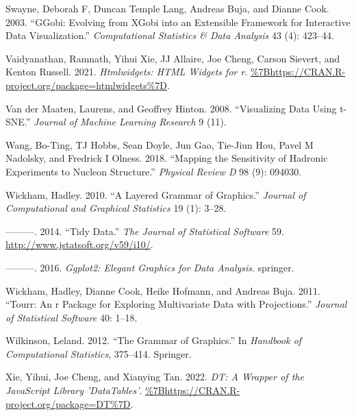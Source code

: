 \begin{CSLReferences}{1}{0}
\leavevmode{}%
Swayne, Deborah F, Duncan Temple Lang, Andreas Buja, and Dianne Cook. 2003. {``GGobi: Evolving from XGobi into an Extensible Framework for Interactive Data Visualization.''} \emph{Computational Statistics \& Data Analysis} 43 (4): 423--44.

\leavevmode{}%
Vaidyanathan, Ramnath, Yihui Xie, JJ Allaire, Joe Cheng, Carson Sievert, and Kenton Russell. 2021. \emph{Htmlwidgets: HTML Widgets for r}. \url{\%7Bhttps://CRAN.R-project.org/package=htmlwidgets\%7D}.

\leavevmode{}%
Van der Maaten, Laurens, and Geoffrey Hinton. 2008. {``Visualizing Data Using t-SNE.''} \emph{Journal of Machine Learning Research} 9 (11).

\leavevmode{}%
Wang, Bo-Ting, TJ Hobbs, Sean Doyle, Jun Gao, Tie-Jiun Hou, Pavel M Nadolsky, and Fredrick I Olness. 2018. {``Mapping the Sensitivity of Hadronic Experiments to Nucleon Structure.''} \emph{Physical Review D} 98 (9): 094030.

\leavevmode{}%
Wickham, Hadley. 2010. {``A Layered Grammar of Graphics.''} \emph{Journal of Computational and Graphical Statistics} 19 (1): 3--28.

\leavevmode{}%
---------. 2014. {``Tidy Data.''} \emph{The Journal of Statistical Software} 59. \url{http://www.jstatsoft.org/v59/i10/}.

\leavevmode{}%
---------. 2016. \emph{Ggplot2: Elegant Graphics for Data Analysis}. springer.

\leavevmode{}%
Wickham, Hadley, Dianne Cook, Heike Hofmann, and Andreas Buja. 2011. {``Tourr: An r Package for Exploring Multivariate Data with Projections.''} \emph{Journal of Statistical Software} 40: 1--18.

\leavevmode{}%
Wilkinson, Leland. 2012. {``The Grammar of Graphics.''} In \emph{Handbook of Computational Statistics}, 375--414. Springer.

\leavevmode{}%
Xie, Yihui, Joe Cheng, and Xianying Tan. 2022. \emph{DT: A Wrapper of the JavaScript Library 'DataTables'}. \url{\%7Bhttps://CRAN.R-project.org/package=DT\%7D}.

\end{CSLReferences}


\address{%
Casper Hart\\
University of Auckland\\%
Department of Statistics\\
%
%
%
\href{mailto:casperhart93@gmail.com}{\nolinkurl{casperhart93@gmail.com}}%
}

\address{%
Earo Wang\\
The University of Auckland\\%
Department of Statistics\\
%
%
%
\href{mailto:earo.wang@gmail.com}{\nolinkurl{earo.wang@gmail.com}}%
}

